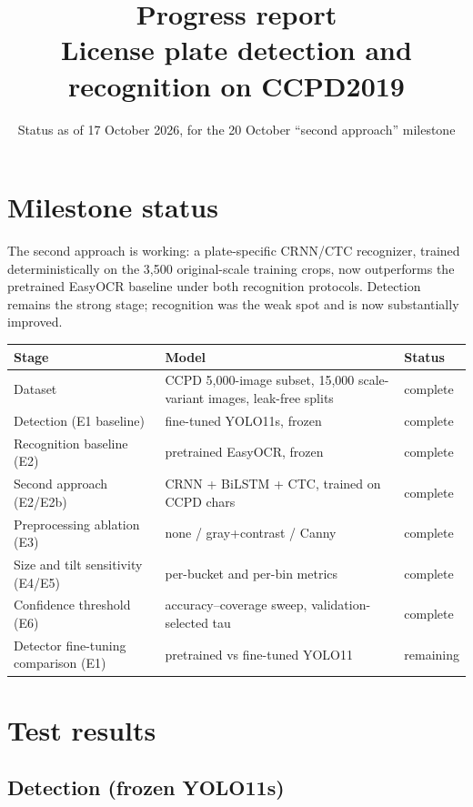 \documentclass[11pt]{article}
\title{Progress report\\ \large License plate detection and recognition on CCPD2019}
\date{Status as of 17 October 2026, for the 20 October ``second approach'' milestone}
\begin{document}
\maketitle

\section{Milestone status}

The second approach is working: a plate-specific CRNN/CTC recognizer, trained
deterministically on the 3{,}500 original-scale training crops, now
outperforms the pretrained EasyOCR baseline under both recognition protocols.
Detection remains the strong stage; recognition was the weak spot and is now
substantially improved.

\begin{table}[h]
\centering
\begin{tabular}{@{}lll@{}}
\toprule
Stage & Model & Status \\
\midrule
Dataset & CCPD 5{,}000-image subset, 15{,}000 scale-variant images, leak-free splits & complete \\
Detection (E1 baseline) & fine-tuned YOLO11s, frozen & complete \\
Recognition baseline (E2) & pretrained EasyOCR, frozen & complete \\
Second approach (E2/E2b) & CRNN + BiLSTM + CTC, trained on CCPD chars & complete \\
Preprocessing ablation (E3) & none / gray+contrast / Canny & complete \\
Size and tilt sensitivity (E4/E5) & per-bucket and per-bin metrics & complete \\
Confidence threshold (E6) & accuracy--coverage sweep, validation-selected tau & complete \\
Detector fine-tuning comparison (E1) & pretrained vs fine-tuned YOLO11 & remaining \\
\bottomrule
\end{tabular}
\end{table}

\section{Test results}

\subsection{Detection (frozen YOLO11s)}
\end{document}
